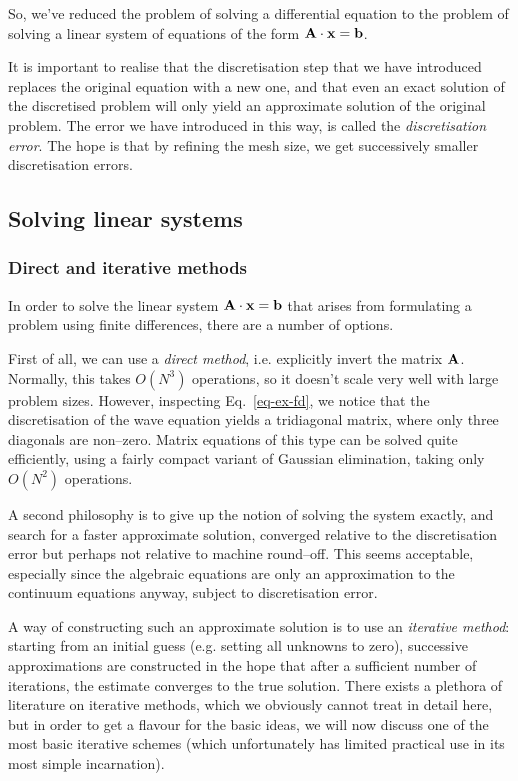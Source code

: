 So, we've reduced the problem of solving a differential equation to the problem of solving a linear system of equations of the form ${\bf A}\cdot{\bf x}={\bf b}$.

It is important to realise that the discretisation step that we have introduced replaces the original equation with a new one, and that even an exact solution of the discretised problem will only yield an approximate solution of the original problem. The error we have introduced in this way, is called the \emph{discretisation error}. The hope is that by refining the mesh size, we get successively smaller discretisation errors. 

\subsection{Solving linear systems}

\subsubsection{Direct and iterative methods}

In order to solve the linear system ${\bf A}\cdot{\bf x}={\bf b}$ that arises from formulating a problem using finite differences, there are a number of options.

First of all, we can use a \emph{direct method}, i.e. explicitly invert the matrix ${\bf A}$. Normally, this takes $O(N^3)$ operations, so it doesn't scale very well with large problem sizes. However, inspecting Eq.~\ref{eq-ex-fd}, we notice that the discretisation of the wave equation yields a tridiagonal matrix, where only three diagonals are non--zero. Matrix equations of this type can be solved quite efficiently, using a fairly compact variant of Gaussian elimination, taking only $O(N^2)$ operations.

A second philosophy is to give up the notion of solving the system exactly, and search for a faster approximate solution, converged relative to the discretisation error but perhaps not relative to machine round--off. This seems acceptable, especially since the algebraic equations are only an approximation to the continuum equations anyway, subject to discretisation error.

A way of constructing such an approximate solution is to use an \emph{iterative method}: starting from an initial guess (e.g. setting all unknowns to zero), successive approximations  are constructed in the hope that after a sufficient number of iterations, the estimate converges to the true solution. There exists a plethora of literature on iterative methods, which we obviously cannot treat in detail here, but in order to get a flavour for the basic ideas, we will now discuss one of the most basic iterative schemes (which unfortunately has limited practical use in its most simple incarnation).

